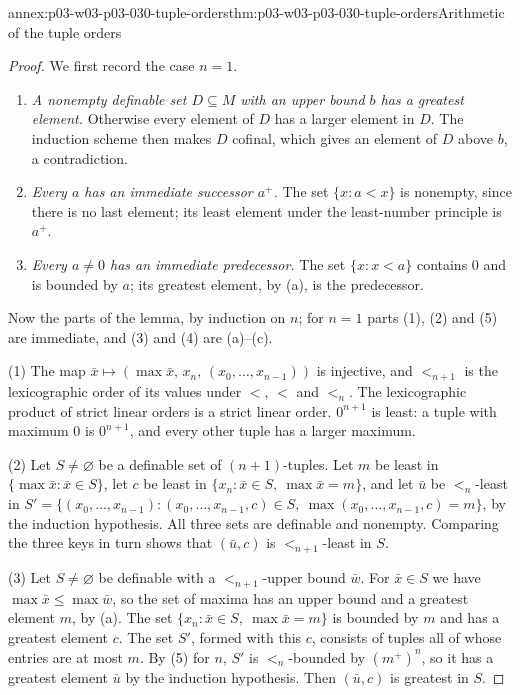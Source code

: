 \begin{annexitem}{annex:p03-w03-p03-030-tuple-orders}{thm:p03-w03-p03-030-tuple-orders}{Arithmetic of the tuple orders}
\begin{proof}
We first record the case \(n=1\).
\begin{enumerate}
\item[(a)] \emph{A nonempty definable set \(D\subseteq M\) with an upper bound
  \(b\) has a greatest element.}  Otherwise every element of \(D\) has a
  larger element in \(D\).  The induction scheme then makes \(D\) cofinal,
  which gives an element of \(D\) above \(b\), a contradiction.
\item[(b)] \emph{Every \(a\) has an immediate successor \(a^+\).}  The set
  \(\{x:a<x\}\) is nonempty, since there is no last element; its least element
  under the least-number principle is \(a^+\).
\item[(c)] \emph{Every \(a\ne0\) has an immediate predecessor.}  The set
  \(\{x:x<a\}\) contains \(0\) and is bounded by \(a\); its greatest element,
  by (a), is the predecessor.
\end{enumerate}
Now the parts of the lemma, by induction on \(n\); for \(n=1\) parts (1),
(2) and (5) are immediate, and (3) and (4) are (a)--(c).

(1) The map \(\bar x\mapsto(\max\bar x,\,x_n,\,(x_0,\ldots,x_{n-1}))\) is
injective, and \(<_{n+1}\) is the lexicographic order of its values under
\(<\), \(<\) and \(<_n\).  The lexicographic product of strict linear orders
is a strict linear order.  \(0^{n+1}\) is least: a tuple with maximum \(0\)
is \(0^{n+1}\), and every other tuple has a larger maximum.

(2) Let \(S\neq\varnothing\) be a definable set of \((n+1)\)-tuples.  Let
\(m\) be least in \(\{\max\bar x:\bar x\in S\}\), let \(c\) be least in
\(\{x_n:\bar x\in S,\ \max\bar x=m\}\), and let \(\bar u\) be \(<_n\)-least in
\(S'=\{(x_0,\ldots,x_{n-1}):(x_0,\ldots,x_{n-1},c)\in S,\
\max(x_0,\ldots,x_{n-1},c)=m\}\), by the induction hypothesis.  All three sets
are definable and nonempty.  Comparing the three keys in turn shows that
\((\bar u,c)\) is \(<_{n+1}\)-least in \(S\).

(3) Let \(S\neq\varnothing\) be definable with a \(<_{n+1}\)-upper bound
\(\bar w\).  For \(\bar x\in S\) we have \(\max\bar x\le\max\bar w\), so the
set of maxima has an upper bound and a greatest element \(m\), by (a).  The
set \(\{x_n:\bar x\in S,\ \max\bar x=m\}\) is bounded by \(m\) and has a
greatest element \(c\).  The set \(S'\), formed with this \(c\), consists of
tuples all of whose entries are at most \(m\).  By (5) for \(n\), \(S'\) is
\(<_n\)-bounded by \((m^+)^n\), so it has a greatest element \(\bar u\) by the
induction hypothesis.  Then \((\bar u,c)\) is greatest in \(S\).


\end{proof}
\end{annexitem}
